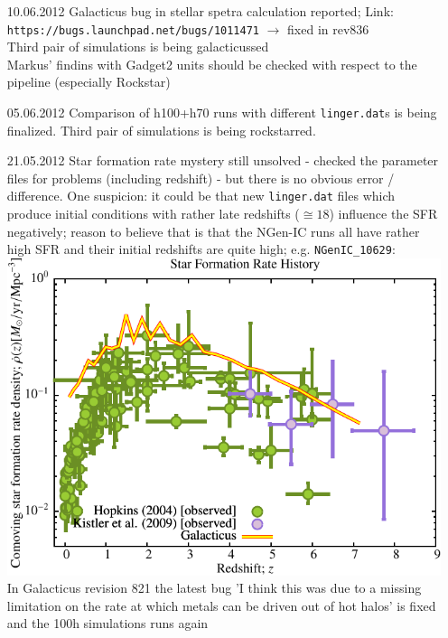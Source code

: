\documentclass[a4paper,11pt,fleqn,oneside]{book}
\begin{document}
\begin{itemize}
\begin{table}[p]
\begin{tabular}{l|c|c}
\end{tabular}
\caption{Comparison}
\end{table}

\texttt{MUSIC\_3} and \texttt{MUSIC\_4} are to be rockstar-tested with 
respect to different particle types  + Markus wants to test refinement \\
Galacticus: "merging halos [...] have zero separation"-error reported 
to Peter Behroozi because this occurs already in \texttt{tree\_0\_0\_0.dat}. \\

\item[10.06.2012]
Galacticus bug in stellar spetra calculation reported; Link:
\texttt{https://bugs.launchpad.net/bugs/1011471} $\rightarrow$ fixed in rev836 \\ 
Third pair of simulations is being galacticussed \\
Markus' findins with Gadget2 units should be checked with respect 
to the pipeline (especially Rockstar) \\

\item[05.06.2012]
Comparison of h100+h70 runs with different \texttt{linger.dat}s 
is being finalized. Third pair of simulations is being rockstarred. \\

\item[21.05.2012]
Star formation rate mystery still unsolved - checked the parameter 
files for problems (including redshift) - but there is no obvious 
error / difference. One suspicion: it could be that new 
\texttt{linger.dat} files 
which produce initial conditions with rather late redshifts ($\cong 18$) 
influence the SFR negatively; reason to believe that is that the 
NGen-IC runs all have rather high SFR and their initial redshifts 
are quite high; e.g. \texttt{NGenIC\_10629}: \\
\includegraphics[scale=0.5]{r256/h100/NGenIC_10629/Plot_Star_Formation_History.pdf}\\
In Galacticus revision 821 the latest bug 'I think this was 
due to a missing limitation on the rate at which metals 
can be driven out of hot halos' is fixed and the 100h 
simulations runs again 



\end{itemize}
\end{document}
